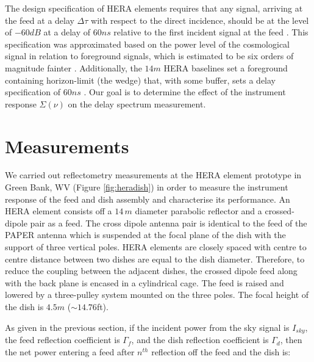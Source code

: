 \documentclass[iop]{emulateapj}
\begin{document}
The design specification of HERA elements requires that any
signal, arriving at the feed at a delay $\Delta \tau$ with respect to the direct incidence, should be
at the level of $-60dB$ at a delay of $60ns$ relative to the first incident
signal at the feed \citep{parsons_deboer_memo}. This specification was
approximated based on the power level of the cosmological signal in relation to
foreground signals, which is estimated to be six orders of magnitude fainter
\citep{santos_et_al2005,ali_et_al2008,deoliveira2008,jelic_et_al2008,bernardi_et_al2009,bernardi_et_al2010,ghosh_et_al2011}. Additionally, the $14m$ HERA baselines set a foreground containing
horizon-limit (the wedge) that, with some buffer, sets a delay specification of
$60ns$
\citep{parsons_et_al2012b,vedantham_et_al2012,nithya_et_al2013,liu_et_al2014a,liu_et_al2014b}. Our goal is to determine the effect of the instrument response $\Sigma(\nu)$ on the delay spectrum measurement. 
\section{Measurements}
We carried out reflectometry measurements at the HERA element prototype in Green
Bank, WV (Figure \ref{fig:heradish}) in order to measure the instrument response of the feed and dish assembly and characterise its performance. An HERA element consists off a $14\,m$ diameter
parabolic reflector and a crossed-dipole pair as a feed. The cross dipole antenna pair is identical to the feed of the PAPER antenna which is suspended at the focal plane of the dish with the support of three vertical poles. HERA elements are closely spaced with centre to centre distance between two dishes are equal to the dish diameter. Therefore, to reduce the coupling between the adjacent dishes, the crossed dipole feed along with the back plane is encased in a cylindrical cage. The feed is raised and
lowered by a three-pulley system mounted on the three poles. The focal height of the dish is $4.5m$
($\sim{14.76}$ft).  




As given in the previous section, if the incident power from the sky signal is $I_{sky}$, the feed
reflection coefficient is $\Gamma_{f}$, and the dish reflection
coefficient is $\Gamma_{d}$, then the net power entering a feed after
$n^{th}$ reflection off the feed and the dish is:
\end{document}
